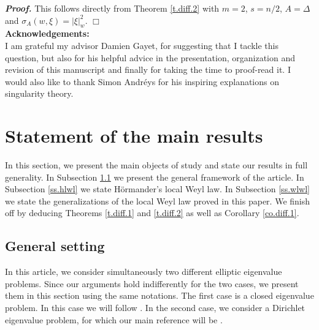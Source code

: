 \documentclass[10pt,twoside]{article}
\newenvironment{prf}[1][]
{\vskip 2mm  {\it \bf Proof#1. }}{$\Box$ \vskip 2mm}
\numberwithin{theorem}{section}
\begin{document}
\begin{prf}
This follows directly from Theorem \ref{t.diff.2} with $m=2$, $s=n/2$, $A=\Delta$ and $\sigma_A(w,\xi)=|\xi|_w^2$.
\end{prf}
\vspace{1cm}$ $\\
\textbf{Acknowledgements:}\\
I am grateful my advisor Damien Gayet, for suggesting that I tackle this question, but also for his helpful advice in the presentation, organization and revision of this manuscript and finally for taking the time to proof-read it. I would also like to thank Simon Andr\' eys for his inspiring explanations on singularity theory.



\section{Statement of the main results}\label{s.results}

In this section, we present the main objects of study and state our results in full generality. In Subsection \ref{ss.setting} we present the general framework of the article. In Subsection \ref{ss.hlwl} we state H\"ormander's local Weyl law. In Subsection \ref{ss.wlwl} we state the generalizations of the local Weyl law proved in this paper. We finish off by deducing Theorems \ref{t.diff.1} and \ref{t.diff.2} as well as Corollary \ref{co.diff.1}.\\

\subsection{General setting}\label{ss.setting}

In this article, we consider simultaneously two different elliptic eigenvalue problems. Since our arguments hold indifferently for the two cases, we present them in this section using the same notations. The first case is a closed eigenvalue problem. In this case we will follow \cite{ho68}. In the second case, we consider a Dirichlet eigenvalue problem, for which our main reference will be \cite{vas83}.
\end{document}
